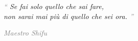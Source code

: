 
\begin{center}


    \begin{quoting}[leftmargin=2.5cm, rightmargin=1.5cm]
    \textit{
    \Huge \textcolor{gray}{“} \normalsize
    Se fai solo quello che sai fare,\\
    non sarai mai più di quello che sei ora.
    \normalsize \Huge \textcolor{gray}{”}
    }
    \end{quoting}

\end{center}

\vspace{0.75em}

\begin{flushright}
    \small %
    \textit{\textcolor{gray}{Maestro Shifu}}
\end{flushright}
